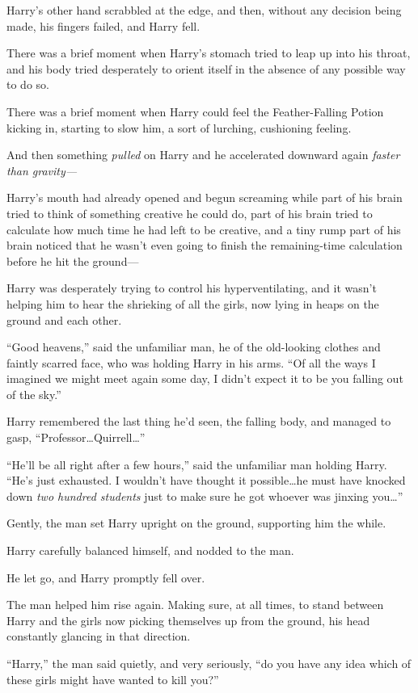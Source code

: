 Harry’s other hand scrabbled at the edge, and then, without any decision being
made, his fingers failed, and Harry fell.

There was a brief moment when Harry’s stomach tried to leap up into his throat,
and his body tried desperately to orient itself in the absence of any possible
way to do so.

There was a brief moment when Harry could feel the Feather-Falling Potion
kicking in, starting to slow him, a sort of lurching, cushioning feeling.

And then something \emph{pulled} on Harry and he accelerated downward again
\emph{faster than gravity—}

Harry’s mouth had already opened and begun screaming while part of his brain
tried to think of something creative he could do, part of his brain tried to
calculate how much time he had left to be creative, and a tiny rump part of his
brain noticed that he wasn’t even going to finish the remaining-time
calculation before he hit the ground—

\later

Harry was desperately trying to control his hyperventilating, and it wasn’t
helping him to hear the shrieking of all the girls, now lying in heaps on the
ground and each other.

“Good heavens,” said the unfamiliar man, he of the old-looking clothes and
faintly scarred face, who was holding Harry in his arms. “Of all the ways I
imagined we might meet again some day, I didn’t expect it to be you falling out
of the sky.”

Harry remembered the last thing he’d seen, the falling body, and managed to
gasp, “Professor…Quirrell…”

“He’ll be all right after a few hours,” said the unfamiliar man holding Harry.
“He’s just exhausted. I wouldn’t have thought it possible…he must have
knocked down \emph{two hundred students} just to make sure he got whoever was
jinxing you…”

Gently, the man set Harry upright on the ground, supporting him the while.

Harry carefully balanced himself, and nodded to the man.

He let go, and Harry promptly fell over.

The man helped him rise again. Making sure, at all times, to stand between
Harry and the girls now picking themselves up from the ground, his head
constantly glancing in that direction.

“Harry,” the man said quietly, and very seriously, “do you have any idea which
of these girls might have wanted to kill you?”

